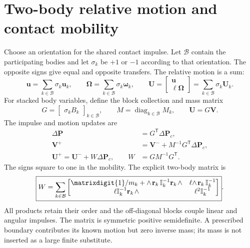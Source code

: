 \documentclass[11pt,a4paper]{article}
\newcommand{\rw}[1]{\mathord{#1\mkern2mu\wedge}}
\newcommand{\lwedge}[1]{\mathord{\wedge\mkern2mu#1}}
\newcommand{\id}{\matrixdigit{1}}
\newcommand{\inertia}{\mathbb I}
\begin{document}
\section{Two-body relative motion and contact mobility}
Choose an orientation for the shared contact impulse. Let $\mathcal B$ contain the participating bodies and let $\sigma_k$ be $+1$ or $-1$ according to that orientation. The opposite signs give equal and opposite transfers. The relative motion is a sum:
\begin{equation}
\mathbf{u}=\sum_{k\in\mathcal B}\sigma_k \mathbf{u}_k,\qquad
\boldsymbol{\Omega}=\sum_{k\in\mathcal B}\sigma_k\boldsymbol{\omega}_k,\qquad
\mathbf{U}=\begin{bmatrix}\mathbf{u}\\\ell\boldsymbol{\Omega}\end{bmatrix}
=\sum_{k\in\mathcal B}\sigma_k \mathbf{U}_k.
\end{equation}
For stacked body variables, define the block collection and mass matrix
\begin{equation}
G=\begin{bmatrix}\sigma_k B_k\end{bmatrix}_{k\in\mathcal B},\qquad
M=\operatorname{diag}_{k\in\mathcal B} M_k,\qquad
\mathbf{U}=G\mathbf{V}.
\end{equation}
The impulse and motion updates are
\begin{align}
\Delta \mathbf{P}&=G^{\mathsf T}\Delta\mathbf{P}_c,\\
\mathbf{V}^+&=\mathbf{V}^-+M^{-1}G^{\mathsf T}\Delta\mathbf{P}_c,\\
\boxed{\mathbf{U}^+=\mathbf{U}^-+W\Delta\mathbf{P}_c},\qquad
W&=GM^{-1}G^{\mathsf T}.
\end{align}
The signs square to one in the mobility. The explicit two-body matrix is
\begin{equation}
\boxed{W=\sum_{k\in\mathcal B}
\begin{bmatrix}
\id/m_k+\lwedge{\mathbf{r}_k}\,\inertia_k^{-1}\rw{\mathbf{r}_k}
&\ell\lwedge{\mathbf{r}_k}\,\inertia_k^{-1}\\
\ell\inertia_k^{-1}\rw{\mathbf{r}_k}&\ell^2\inertia_k^{-1}
\end{bmatrix}}.
\end{equation}
All products retain their order and the off-diagonal blocks couple linear and angular impulses. The matrix is symmetric positive semidefinite. A prescribed boundary contributes its known motion but zero inverse mass; its mass is not inserted as a large finite substitute.
\end{document}
